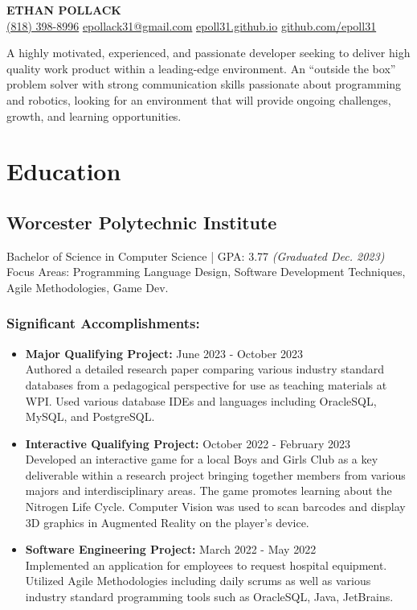 \documentclass[a4paper,10pt]{article}
\begin{document}
\pagecolor{bg}

\begin{center}
    \textbf{\LARGE ETHAN 
    POLLACK} \\
    \href{tel:(818) 398-8996}{(818) 398-8996} \quad
    \href{mailto:epollack31@gmail.com}{epollack31@gmail.com} \quad
    \href{https://epoll31.github.io}{epoll31.github.io} \quad
    \href{https://github.com/epoll31}{github.com/epoll31}
\end{center}

\noindent A highly motivated, experienced, and passionate developer seeking to deliver high quality work product within a leading-edge environment. An “outside the box” problem solver with strong communication skills passionate about programming and robotics, looking for an environment that will provide ongoing challenges, growth, and learning opportunities.

\section*{Education}
\subsection*{Worcester Polytechnic Institute} Bachelor of Science in Computer Science | GPA: 3.77 \textit{(Graduated Dec. 2023)}\\
Focus Areas: Programming Language Design, Software Development Techniques, Agile Methodologies, Game Dev.
\subsubsection*{Significant Accomplishments:}
    \begin{itemize}
        \item \textbf{Major Qualifying Project:} June 2023 - October 2023\\
        Authored a detailed research paper comparing various industry standard databases from a pedagogical perspective for use as teaching materials at WPI. Used various database IDEs and languages including OracleSQL, MySQL, and PostgreSQL.
        \item \textbf{Interactive Qualifying Project:} October 2022 - February 2023\\
        Developed an interactive game for a local Boys and Girls Club as a key deliverable within a research project bringing together members from various majors and interdisciplinary areas. The game promotes learning about the Nitrogen Life Cycle. Computer Vision was used to scan barcodes and display 3D graphics in Augmented Reality on the player’s device.
        \item \textbf{Software Engineering Project:} March 2022 - May 2022\\
        Implemented an application for employees to request hospital equipment. Utilized Agile Methodologies including daily scrums as well as various industry standard programming tools such as OracleSQL, Java, JetBrains.
    \end{itemize}
\end{document}
